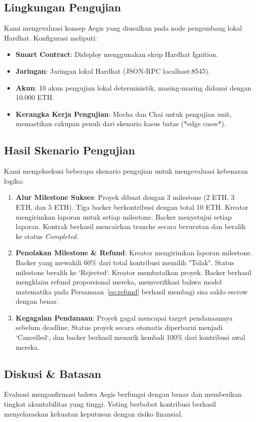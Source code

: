 \documentclass[conference]{IEEEtran}
\begin{document}
\subsection{Lingkungan Pengujian}
Kami mengevaluasi konsep Aegis yang diusulkan pada node pengembang lokal Hardhat. Konfigurasi meliputi:
\begin{itemize}
	\item \textbf{Smart Contract}: Dideploy menggunakan skrip Hardhat Ignition.
	\item \textbf{Jaringan}: Jaringan lokal Hardhat (JSON-RPC localhost:8545).
	\item \textbf{Akun}: 10 akun pengujian lokal deterministik, masing-masing didanai dengan 10.000 ETH.
	\item \textbf{Kerangka Kerja Pengujian}: Mocha dan Chai untuk pengujian unit, memastikan cakupan penuh dari skenario kasus batas (*edge cases*).
\end{itemize}

\subsection{Hasil Skenario Pengujian}
Kami mengeksekusi beberapa skenario pengujian untuk mengevaluasi kebenaran logika:
\begin{enumerate}
	\item \textbf{Alur Milestone Sukses}: Proyek dibuat dengan 3 milestone (2 ETH, 3 ETH, dan 5 ETH). Tiga backer berkontribusi dengan total 10 ETH. Kreator mengirimkan laporan untuk setiap milestone. Backer menyetujui setiap laporan. Kontrak berhasil mencairkan tranche secara berurutan dan beralih ke status \textit{Completed}.
	\item \textbf{Penolakan Milestone \& Refund}: Kreator mengirimkan laporan milestone. Backer yang mewakili 60\% dari total kontribusi memilih "Tolak". Status milestone beralih ke `Rejected`. Kreator membatalkan proyek. Backer berhasil mengklaim refund proporsional mereka, memverifikasi bahwa model matematika pada Persamaan~\eqref{eq:refund} berhasil membagi sisa saldo escrow dengan benar.
	\item \textbf{Kegagalan Pendanaan}: Proyek gagal mencapai target pendanaannya sebelum deadline. Status proyek secara otomatis diperbarui menjadi `Cancelled`, dan backer berhasil menarik kembali 100\% dari kontribusi awal mereka.
\end{enumerate}

\subsection{Diskusi \& Batasan}
Evaluasi mengonfirmasi bahwa Aegis berfungsi dengan benar dan memberikan tingkat akuntabilitas yang tinggi. Voting berbobot kontribusi berhasil menyelaraskan kekuatan keputusan dengan risiko finansial.
\end{document}
